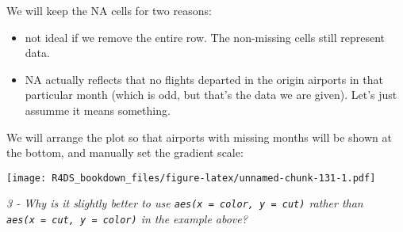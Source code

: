 \documentclass[]{article}
\newenvironment{Shaded}{\begin{snugshade}}{\end{snugshade}}
\newcommand{\KeywordTok}[1]{\textcolor[rgb]{0.13,0.29,0.53}{\textbf{#1}}}
\newcommand{\DataTypeTok}[1]{\textcolor[rgb]{0.13,0.29,0.53}{#1}}
\newcommand{\DecValTok}[1]{\textcolor[rgb]{0.00,0.00,0.81}{#1}}
\newcommand{\StringTok}[1]{\textcolor[rgb]{0.31,0.60,0.02}{#1}}
\newcommand{\OtherTok}[1]{\textcolor[rgb]{0.56,0.35,0.01}{#1}}
\newcommand{\OperatorTok}[1]{\textcolor[rgb]{0.81,0.36,0.00}{\textbf{#1}}}
\newcommand{\NormalTok}[1]{#1}
\providecommand{\tightlist}{%
  \setlength{\itemsep}{0pt}\setlength{\parskip}{0pt}}
\theoremstyle{definition}
\theoremstyle{definition}
\theoremstyle{definition}
\theoremstyle{remark}
\begin{document}
We will keep the NA cells for two reasons:

\begin{itemize}
\tightlist
\item
  not ideal if we remove the entire row. The non-missing cells still
  represent data.
\item
  NA actually reflects that no flights departed in the origin airports
  in that particular month (which is odd, but that's the data we are
  given). Let's just assumme it means something.
\end{itemize}

We will arrange the plot so that airports with missing months will be
shown at the bottom, and manually set the gradient scale:

\begin{Shaded}
\end{Shaded}

\texttt{[image: R4DS\_bookdown\_files/figure-latex/unnamed-chunk-131-1.pdf]}

\emph{3 - Why is it slightly better to use
\texttt{aes(x\ =\ color,\ y\ =\ cut)} rather than
\texttt{aes(x\ =\ cut,\ y\ =\ color)} in the example above?}
\end{document}

